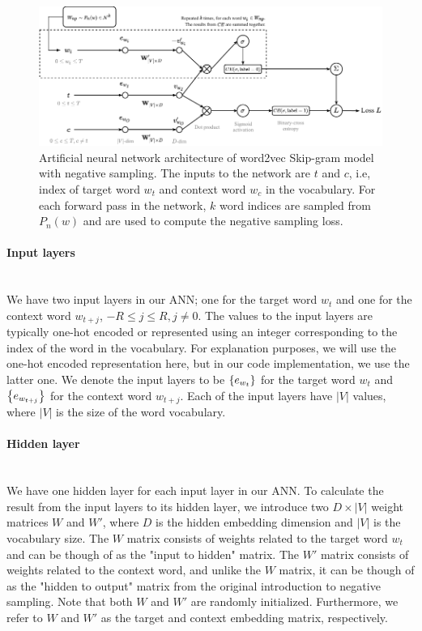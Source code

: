 \begin{figure}[ht]
    \centering
    \includegraphics[width=16cm]{thesis/figures/word2vec-sgns_cropped.pdf}
    \caption{Artificial neural network architecture of word2vec Skip-gram model with negative sampling. The inputs to the network are $t$ and $c$, i.e, index of target word $w_t$ and context word $w_c$ in the vocabulary. For each forward pass in the network, $k$ word indices are sampled from $P_n(w)$ and are used to compute the negative sampling loss.}
    \label{fig:word2vec-skip-gram-negative-sampling}
\end{figure}

\paragraph*{Input layers}\mbox{} \\
We have two input layers in our ANN; one for the target word $w_t$ and one for the context word $w_{t+j}$, $-R \leq j \leq R, j \neq 0$. The values to the input layers are typically one-hot encoded or represented using an integer corresponding to the index of the word in the vocabulary. For explanation purposes, we will use the one-hot encoded representation here, but in our code implementation, we use the latter one. We denote the input layers to be $\left\{e_{w_t}\right\}$ for the target word $w_t$ and $\left\{e_{w_{t+j}}\right\}$ for the context word $w_{t+j}$. Each of the input layers have $|V|$ values, where $|V|$ is the size of the word vocabulary.

\paragraph*{Hidden layer}\mbox{} \\
We have one hidden layer for each input layer in our ANN. To calculate the result from the input layers to its hidden layer, we introduce two $D \times |V|$ weight matrices $W$ and $W'$, where $D$ is the hidden embedding dimension and $|V|$ is the vocabulary size. The $W$ matrix consists of weights related to the target word $w_t$ and can be though of as the "input to hidden" matrix. The $W'$ matrix consists of weights related to the context word, and unlike the $W$ matrix, it can be though of as the "hidden to output" matrix from the original introduction to negative sampling. Note that both $W$ and $W'$ are randomly initialized. Furthermore, we refer to $W$ and $W'$ as the target and context embedding matrix, respectively.

